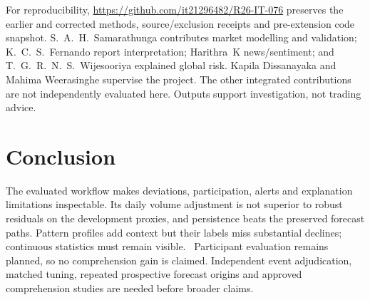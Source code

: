 \documentclass[conference]{IEEEtran}
\begin{document}
For reproducibility, \url{https://github.com/it21296482/R26-IT-076} preserves the earlier and corrected methods, source/exclusion receipts and pre-extension code snapshot. S.~A.~H.~Samarathunga contributes market modelling and validation; K.~C.~S.~Fernando report interpretation; Harithra~K news/sentiment; and T.~G.~R.~N.~S.~Wijesooriya explained global risk. Kapila Dissanayaka and Mahima Weerasinghe supervise the project. The other integrated contributions are not independently evaluated here. Outputs support investigation, not trading advice.

\section{Conclusion}
The evaluated workflow makes deviations, participation, alerts and explanation limitations inspectable. Its daily volume adjustment is not superior to robust residuals on the development proxies, and persistence beats the preserved forecast paths. Pattern profiles add context but their labels miss substantial declines; continuous statistics must remain visible. \ReplicationConclusion\ Participant evaluation remains planned, so no comprehension gain is claimed. Independent event adjudication, matched tuning, repeated prospective forecast origins and approved comprehension studies are needed before broader claims.



\end{document}
